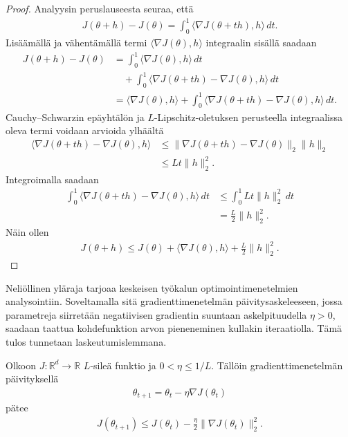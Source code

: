 \begin{proof}
  Analyysin peruslauseesta seuraa, että
  \begin{align*}
    J(\theta+h)-J(\theta)
    =
    \int_0^1
    \langle \nabla J(\theta+th),h\rangle\,dt.
  \end{align*}
  Lisäämällä ja vähentämällä termi
  \(\langle\nabla J(\theta),h\rangle\) integraalin sisällä saadaan
  \begin{align*}
    J(\theta+h)-J(\theta)
    &=
    \int_0^1
    \langle\nabla J(\theta),h\rangle\,dt \\
    &\quad+
    \int_0^1
    \langle\nabla J(\theta+th)-\nabla J(\theta),h\rangle\,dt \\
    &=
    \langle\nabla J(\theta),h\rangle
    +
    \int_0^1
    \langle\nabla J(\theta+th)-\nabla J(\theta),h\rangle\,dt.
  \end{align*}
  Cauchy--Schwarzin epäyhtälön ja \(L\)-Lipschitz-oletuksen perusteella
  integraalissa oleva termi voidaan arvioida ylhäältä
  \begin{align*}
    \langle\nabla J(\theta+th)-\nabla J(\theta),h\rangle
    &\le
    \|\nabla J(\theta+th)-\nabla J(\theta)\|_2
    \|h\|_2 \\
    &\le
    Lt\|h\|_2^2.
  \end{align*}
  Integroimalla saadaan
  \begin{align*}
    \int_0^1
    \langle\nabla J(\theta+th)-\nabla J(\theta),h\rangle\,dt
    &\le
    \int_0^1 Lt\|h\|_2^2\,dt \\
    &=
    \frac{L}{2}\|h\|_2^2.
  \end{align*}
  Näin ollen
  \begin{align*}
    J(\theta+h)
    \le
    J(\theta)
    +
    \langle\nabla J(\theta),h\rangle
    +
    \frac{L}{2}\|h\|_2^2.
  \end{align*}
\end{proof}

Neliöllinen yläraja tarjoaa keskeisen työkalun optimointimenetelmien
analysointiin. Soveltamalla sitä gradienttimenetelmän päivitysaskeleeseen,
jossa parametreja siirretään negatiivisen gradientin suuntaan askelpituudella
\(\eta > 0\), saadaan taattua kohdefunktion arvon pieneneminen kullakin
iteraatiolla. Tämä tulos tunnetaan laskeutumislemmana.

\begin{lemma}[Laskeutumislemma]\label{lem:gradient_descent_lemma}
  Olkoon \(J:\mathbb{R}^d\to\mathbb{R}\) \(L\)-sileä funktio ja
  \(0<\eta\le 1/L\). Tällöin gradienttimenetelmän päivityksellä
  \begin{align*}
    \theta_{t+1}
    =
    \theta_t-\eta\nabla J(\theta_t)
  \end{align*}
  pätee
  \begin{align*}
    J(\theta_{t+1})
    \le
    J(\theta_t)
    -
    \frac{\eta}{2}\|\nabla J(\theta_t)\|_2^2.
  \end{align*}
\end{lemma}

